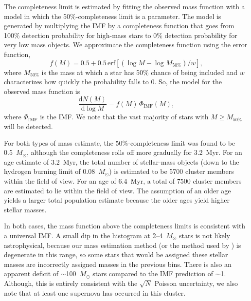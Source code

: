 \documentclass[twocolumn,tighten]{aastex61}
\begin{document}
The completeness limit is estimated by fitting the observed mass function with a model in which the 50\%-completeness limit is a parameter. The model is generated by multiplying the \citeauthor{2013MNRAS.429.1725M} IMF by a completeness function that goes from 100\% detection probability for high-mass stars to 0\% detection probability for very low mass objects. We approximate the completeness function using the error function,
\begin{equation}
f(M)=0.5+0.5\,\mathrm{erf}[(\log M- \log M_{50\%})/w],
\end{equation}
where $M_{50\%}$ is the mass at which a star has 50\% chance of being included and $w$ characterizes how quickly the probability falls to 0. So, the model for the observed mass function is
\begin{equation}
\frac{\mathrm{d}N(M)}{\mathrm{d}\log M}=f(M)\,\Phi_\mathrm{IMF}(M),
\end{equation}
where $\Phi_\mathrm{IMF}$ is the \citeauthor{2013MNRAS.429.1725M} IMF. We note that the vast majority of stars with $M\ge M_{50\%}$ will be detected.

For both types of mass estimate, the 50\%-completeness limit was found to be 0.5~$M_\odot$, although the completeness rolls off more gradually for 3.2~Myr. For an age estimate of 3.2~Myr, the total number of stellar-mass objects (down to the hydrogen burning limit of 0.08~$M_\odot$) is estimated to be 5700 cluster members within the field of view. For an age of 6.4~Myr, a total of 7500 cluster members are estimated to lie within the field of view. The assumption of an older age yields a larger total population estimate because the older ages yield higher stellar masses. 

In both cases, the mass function above the completeness limits is consistent with a universal IMF. A small dip in the histogram at 2--4~$M_\odot$ stars is not likely astrophysical, because our mass estimation method (or the method used by ) is degenerate in this range, so some stars that would be assigned these stellar masses are incorrectly assigned masses in the previous bins. There is also an apparent deficit of $\sim$100~$M_\odot$ stars compared to the IMF prediction of $\sim$1. Although, this is entirely consistent with the $\sqrt{N}$ Poisson uncertainty, we also note that at least one supernova has occurred in this cluster.
\end{document}
